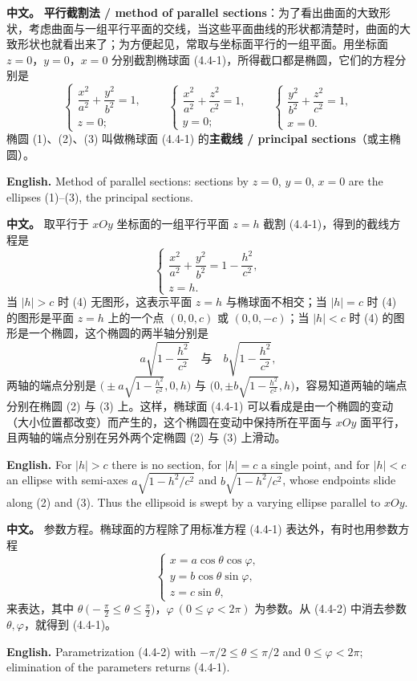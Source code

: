 \documentclass[UTF8,11pt,a4paper]{ctexart}
\newcommand{\APS}[2]{\par\noindent\textbf{中文。} #1\par\noindent\textbf{English.} #2\par\smallskip}
\theoremstyle{definition}
\begin{document}
\APS{\textbf{平行截割法 / method of parallel sections}：为了看出曲面的大致形状，考虑曲面与一组平行平面的交线，当这些平面曲线的形状都清楚时，曲面的大致形状也就看出来了；为方便起见，常取与坐标面平行的一组平面。用坐标面 $z=0$，$y=0$，$x=0$ 分别截割椭球面 (4.4-1)，所得截口都是椭圆，它们的方程分别是
\[
\begin{cases}\dfrac{x^2}{a^2}+\dfrac{y^2}{b^2}=1,\\ z=0;\end{cases}\qquad
\begin{cases}\dfrac{x^2}{a^2}+\dfrac{z^2}{c^2}=1,\\ y=0;\end{cases}\qquad
\begin{cases}\dfrac{y^2}{b^2}+\dfrac{z^2}{c^2}=1,\\ x=0.\end{cases}\tag{1--3}
\]
椭圆 (1)、(2)、(3) 叫做椭球面 (4.4-1) 的\textbf{主截线 / principal sections}（或主椭圆）。}{Method of parallel sections: sections by $z=0$, $y=0$, $x=0$ are the ellipses (1)--(3), the principal sections.}

\APS{取平行于 $xOy$ 坐标面的一组平行平面 $z=h$ 截割 (4.4-1)，得到的截线方程是
\[
\begin{cases}\dfrac{x^2}{a^2}+\dfrac{y^2}{b^2}=1-\dfrac{h^2}{c^2},\\ z=h.\end{cases}\tag{4}
\]
当 $|h|>c$ 时 (4) 无图形，这表示平面 $z=h$ 与椭球面不相交；当 $|h|=c$ 时 (4) 的图形是平面 $z=h$ 上的一个点 $(0,0,c)$ 或 $(0,0,-c)$；当 $|h|<c$ 时 (4) 的图形是一个椭圆，这个椭圆的两半轴分别是
\[
a\sqrt{1-\frac{h^2}{c^2}}\quad\text{与}\quad b\sqrt{1-\frac{h^2}{c^2}},
\]
两轴的端点分别是 $\bigl(\pm a\sqrt{1-\frac{h^2}{c^2}},0,h\bigr)$ 与 $\bigl(0,\pm b\sqrt{1-\frac{h^2}{c^2}},h\bigr)$，容易知道两轴的端点分别在椭圆 (2) 与 (3) 上。这样，椭球面 (4.4-1) 可以看成是由一个椭圆的变动（大小位置都改变）而产生的，这个椭圆在变动中保持所在平面与 $xOy$ 面平行，且两轴的端点分别在另外两个定椭圆 (2) 与 (3) 上滑动。}{For $|h|>c$ there is no section, for $|h|=c$ a single point, and for $|h|<c$ an ellipse with semi-axes $a\sqrt{1-h^2/c^2}$ and $b\sqrt{1-h^2/c^2}$, whose endpoints slide along (2) and (3). Thus the ellipsoid is swept by a varying ellipse parallel to $xOy$.}

\APS{参数方程。椭球面的方程除了用标准方程 (4.4-1) 表达外，有时也用参数方程
\[
\begin{cases}x=a\cos\theta\cos\varphi,\\ y=b\cos\theta\sin\varphi,\\ z=c\sin\theta,\end{cases}\tag{4.4-2}
\]
来表达，其中 $\theta\ \bigl(-\frac{\pi}{2}\le\theta\le\frac{\pi}{2}\bigr)$，$\varphi\ (0\le\varphi<2\pi)$ 为参数。从 (4.4-2) 中消去参数 $\theta,\varphi$，就得到 (4.4-1)。}{Parametrization (4.4-2) with $-\pi/2\le\theta\le\pi/2$ and $0\le\varphi<2\pi$; elimination of the parameters returns (4.4-1).}
\end{document}
